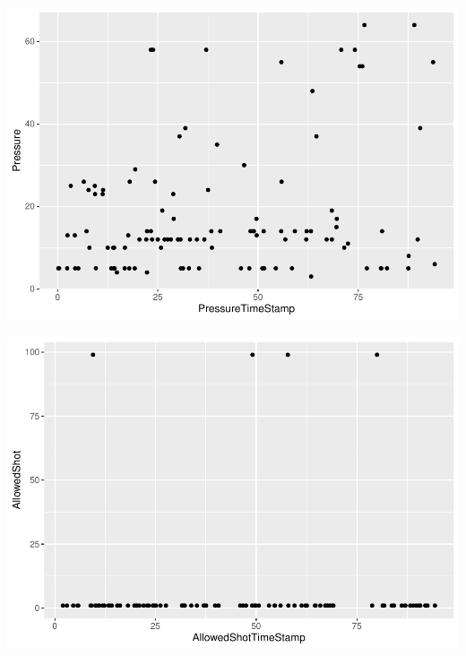 \documentclass[]{article}
\newenvironment{Shaded}{\begin{snugshade}}{\end{snugshade}}
\newcommand{\DecValTok}[1]{\textcolor[rgb]{0.00,0.00,0.81}{#1}}
\newcommand{\KeywordTok}[1]{\textcolor[rgb]{0.13,0.29,0.53}{\textbf{#1}}}
\newcommand{\NormalTok}[1]{#1}
\newcommand{\OperatorTok}[1]{\textcolor[rgb]{0.81,0.36,0.00}{\textbf{#1}}}
\newcommand{\StringTok}[1]{\textcolor[rgb]{0.31,0.60,0.02}{#1}}
\begin{document}
\includegraphics{GraphAnalysis_files/figure-latex/Presssure Game Duration-1.pdf}

\begin{Shaded}
\end{Shaded}

\includegraphics{GraphAnalysis_files/figure-latex/Allowed Shot Game Duration-1.pdf}
\end{document}
